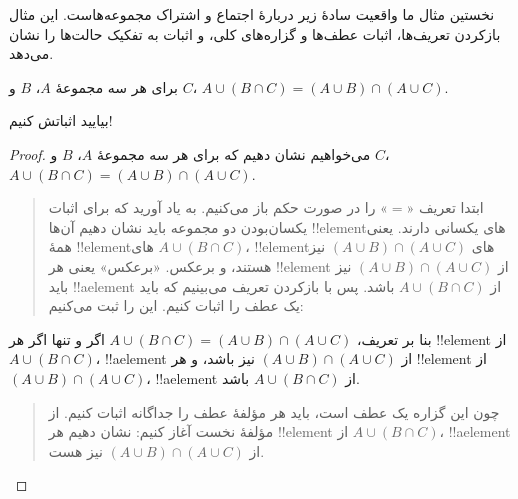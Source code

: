 \documentclass[../../../include/open-logic-section]{subfiles}
\begin{document}


نخستین مثال ما واقعیت سادهٔ زیر دربارهٔ اجتماع و اشتراک مجموعه‌هاست.
این مثال بازکردن تعریف‌ها، اثبات عطف‌ها و گزاره‌های کلی، و اثبات به
تفکیک حالت‌ها را نشان می‌دهد.

\begin{prop}
برای هر سه مجموعهٔ $A$، $B$ و $C$،
$A \cup (B \cap C) = (A \cup B) \cap (A \cup C)$.
\end{prop}

بیایید اثباتش کنیم!{}

\begin{proof}
می‌خواهیم نشان دهیم که برای هر سه مجموعهٔ $A$، $B$ و $C$،
$A \cup (B \cap C) = (A \cup B) \cap (A \cup C)$.
\begin{quote}
ابتدا تعریف «$=$» را در صورت حکم باز می‌کنیم. به یاد آورید که برای
اثبات یکسان‌بودن دو مجموعه باید نشان دهیم آن‌ها !!{element}های یکسانی
دارند. یعنی همهٔ !!{element}های $A \cup (B \cap C)$، !!{element}های
$(A \cup B) \cap (A \cup C)$ نیز هستند، و برعکس. «برعکس» یعنی هر
!!{element} از $(A \cup B) \cap (A \cup C)$ نیز باید !!a{element} از
$A \cup (B \cap C)$ باشد. پس با بازکردن تعریف می‌بینیم که باید یک عطف
را اثبات کنیم. این را ثبت می‌کنیم:
\end{quote}
بنا بر تعریف، $A \cup (B \cap C) = (A \cup B) \cap (A \cup C)$ اگر و
تنها اگر هر !!{element} از $A \cup (B \cap C)$، !!a{element} از
$(A \cup B) \cap (A \cup C)$ نیز باشد، و هر !!{element} از
$(A \cup B) \cap (A \cup C)$، !!a{element} از $A \cup (B \cap C)$ باشد.
\begin{quote}
چون این گزاره یک عطف است، باید هر مؤلفهٔ عطف را جداگانه اثبات کنیم.
از مؤلفهٔ نخست آغاز کنیم: نشان دهیم هر !!{element} از
$A \cup (B \cap C)$، !!a{element} از $(A \cup B) \cap (A \cup C)$ نیز
هست.


\end{quote}
\end{proof}
\end{document}
